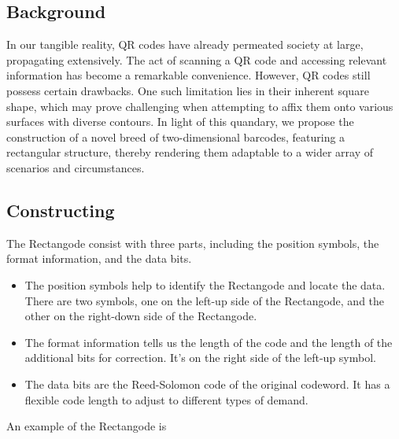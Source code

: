 \documentclass[12pt]{article}
\begin{document}
\subsection{Background}
In our tangible reality, QR codes have already permeated society at large, propagating extensively. The act of scanning a QR code and accessing relevant information has become a remarkable convenience. However, QR codes still possess certain drawbacks. One such limitation lies in their inherent square shape, which may prove challenging when attempting to affix them onto various surfaces with diverse contours. In light of this quandary, we propose the construction of a novel breed of two-dimensional barcodes, featuring a rectangular structure, thereby rendering them adaptable to a wider array of scenarios and circumstances.

\subsection{Constructing}
The Rectangode consist with three parts, including the position symbols, the format information, and the data bits. 
\begin{itemize}
    \item The position symbols help to identify the Rectangode and locate the data. There are two symbols, one on the left-up side of the Rectangode, and the other on the right-down side of the Rectangode.
    \item  The format information tells us the length of the code and the length of the additional bits for correction. It's on the right side of the left-up symbol.
    \item  The data bits are the Reed-Solomon code of the original codeword. It has a flexible code length to adjust to different types of demand.
\end{itemize}
An example of the Rectangode is 


\end{document}
